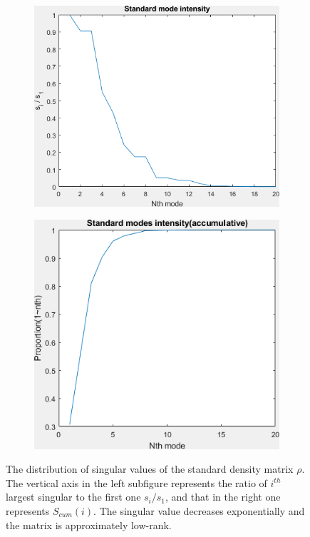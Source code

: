 \documentclass{article}
\numberwithin{equation}{section}
\begin{document}
\begin{enumerate}[leftmargin=*]
 \begin{figure}[H]
  \begin{subfigure}{.5\textwidth}
    \centering
    \includegraphics[width=0.9\linewidth]{../figures/singular.png}  
    \label{fig:singular}
  \end{subfigure}
  \begin{subfigure}{.5\textwidth}
    \centering
    \includegraphics[width=.8\linewidth]{../figures/singular_accumative.png}  
    \label{fig:singular_acc}
  \end{subfigure}
  \caption{The distribution of singular values of the standard density matrix $\rho$. The vertical axis in the left subfigure represents the ratio of $i^{th}$ largest singular to the first one $s_i/s_1$, and that in the right one represents $S_{cum}(i)$. The singular value decreases exponentially and the matrix is approximately low-rank. }
  \label{fig:standard singular}
  \end{figure}
  

\end{enumerate}
\end{document}
